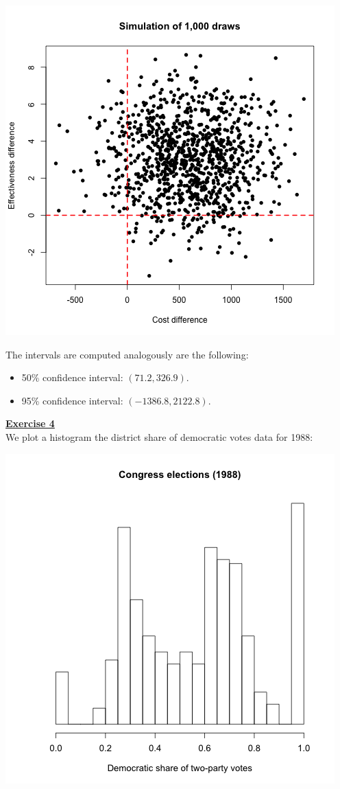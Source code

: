 \documentclass[a4paper, 11pt]{article}
\begin{document}
\begin{center}
\includegraphics[scale=0.6]{plot_ex3dot3.png}
\end{center}
The intervals are computed analogously are the following:
\begin{itemize}
\item 50\% confidence interval: $(71.2, 326.9)$.
\item 95\% confidence interval: $(-1386.8, 2122.8)$.
\end{itemize}
\newpage
\textbf{\underline{Exercise 4}}\\
\newline We plot a histogram the district share of democratic votes data for 1988:
\begin{center}
\includegraphics[scale=0.5]{plot_ex4_1.png}
\end{center}
\end{document}

